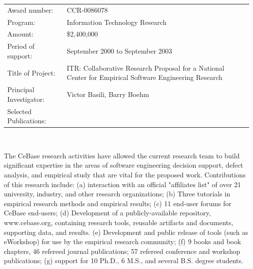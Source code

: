 \medskip
\noindent
\small
\begin{tabular}{lp{4.5in}}

Award number: & CCR-0086078 \\
Program: & Information Technology Research\\
Amount: & \$2,400,000 \\
Period of support: & September 2000 to September 2003 \\
Title of Project: & ITR: Collaborative Research Proposal for a National Center for Empirical Software Engineering Research\\
Principal Investigator: & Victor Basili, Barry Boehm \\
Selected Publications: & \cite{Basili01b,Basili02b,Boehm02,Jiwnani02,Morisio02,Rus02,Shull02,Shull02b}
\end{tabular} \\[3mm]
\normalsize

The CeBase research activities have allowed the current research team to
build significant expertise in the areas of software engineering decision
support, defect analysis, and empirical study that are vital for the
proposed work. Contributions of this research include: (a) interaction with
an official "affiliates list" of over 21 university, industry, and other
research organizations; (b) Three tutorials in empirical research methods
and empirical results; (c) 11 end-user forums for CeBase end-users; (d)
Development of a publicly-available repository, www.cebase.org, containing
research tools, reusable artifacts and documents, supporting data, and
results. (e) Development and public release of tools (such as eWorkshop)
for use by the empirical research community; (f) 9 books and book chapters,
46 refereed journal publications; 57 refereed conference and workshop
publications; (g) support for 10 Ph.D., 6 M.S., and several B.S. degree students. 


